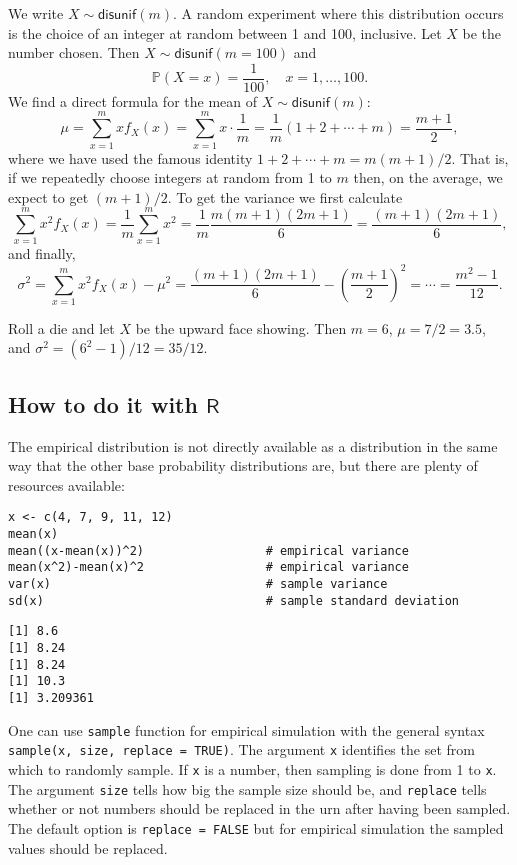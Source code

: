 We write \(X\sim\mathsf{disunif}(m)\). A random experiment where this
distribution occurs is the choice of an integer at random between 1
and 100, inclusive. Let \(X\) be the number chosen. Then
\(X\sim\mathsf{disunif}(m=100)\) and
\[
\mathbb{P}(X=x)=\frac{1}{100},\quad x=1,\ldots,100.
\]
We find a direct formula for the mean of \(X\sim\mathsf{disunif}(m)\):
\begin{equation}
\mu = \sum_{x = 1}^{m}xf_{X}(x) = \sum_{x = 1}^{m}x \cdot \frac{1}{m} = \frac{1}{m}(1 + 2 + \cdots + m) = \frac{m + 1}{2},
\end{equation}
where we have used the famous identity \(1 + 2 + \cdots + m = m(m +
1)/2\). That is, if we repeatedly choose integers at random from 1 to
\(m\) then, on the average, we expect to get \((m+1)/2\). To get the
variance we first calculate \[ \sum_{x = 1}^{m} x^{2} f_{X}(x) =
\frac{1}{m} \sum_{x = 1}^{m} x^{2} = \frac{1}{m}\frac{m(m + 1)(2m +
1)}{6} = \frac{(m + 1)(2m + 1)}{6}, \] and finally,
\begin{equation}
\sigma^{2} = \sum_{x = 1}^{m} x^{2} f_{X}(x) - \mu^{2} = \frac{(m + 1)(2m + 1)}{6} - \left(\frac{m + 1}{2}\right)^{2} = \cdots = \frac{m^{2} - 1}{12}.
\end{equation}

Roll a die and  let \(X\) be the upward face showing.  Then \(m = 6\),
\(\mu = 7/2 = 3.5\), and \(\sigma^{2} = (6^{2} - 1)/12 = 35/12\).

\subsection{How to do it with \(\mathsf{R}\)}
\label{sec-5-5-1}

The empirical distribution is not directly available as a distribution
in the same way that the other base probability distributions are, but
there are plenty of resources available:

\begin{Verbatim}
x <- c(4, 7, 9, 11, 12)
mean(x)
mean((x-mean(x))^2)                 # empirical variance
mean(x^2)-mean(x)^2                 # empirical variance
var(x)                              # sample variance
sd(x)                               # sample standard deviation
\end{Verbatim}

\begin{verbatim}
[1] 8.6
[1] 8.24
[1] 8.24
[1] 10.3
[1] 3.209361
\end{verbatim}

One can use \texttt{sample} function for empirical simulation with the general syntax
\texttt{sample(x, size, replace = TRUE)}.
The argument \texttt{x} identifies the set from which to randomly
sample. If \texttt{x} is a number, then sampling is done from 1 to \texttt{x}. The
argument \texttt{size} tells how big the sample size should be, and \texttt{replace}
tells whether or not numbers should be replaced in the urn after
having been sampled. The default option is \texttt{replace = FALSE} but for
empirical simulation the sampled values should be replaced.

